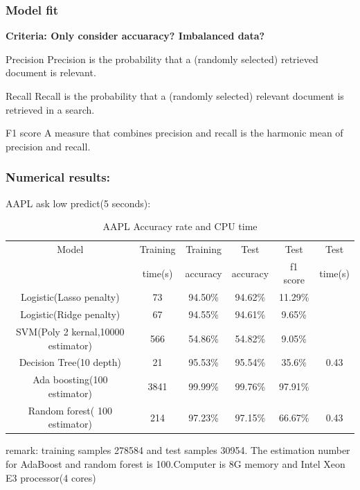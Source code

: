 \documentclass[xcolor={x11names,svgnames,dvipsnames}]{beamer}
\begin{document}
\begin{frame}
\frametitle{Model fit}
\small \textbf{Criteria: Only consider accuaracy? Imbalanced data?}\\
\begin{block}{Precision}
\scriptsize{Precision is the probability that a (randomly selected) retrieved document is relevant.}\\
\end{block}
\begin{block}{Recall}
\scriptsize{Recall is the probability that a (randomly selected) relevant document is retrieved in a search.}\\
\end{block}
\begin{block}{F1 score}
\scriptsize{A measure that combines precision and recall is the harmonic mean of precision and recall.}\\
\end{block}

\end{frame}


\begin{frame}
\frametitle{Numerical results:}

\begin{block}{AAPL ask low predict(5 seconds):}
\begin{table}[h!]\scriptsize
  \caption{AAPL Accuracy rate and CPU time}
\begin{center}
    \begin{tabular}{| c | c|c|c|c|c|}
    \hline

Model&	Training &	Training &	Test &	Test& Test\\
&	time(s)&	accuracy&	accuracy&	f1 score& time(s)\\
    \hline
Logistic(Lasso penalty)&	73&	94.50\%& 	94.62\%& 	11.29\%&\\
Logistic(Ridge penalty)	& 67&	94.55\%& 	94.61\%& 	9.65\%&\\
SVM(Poly 2 kernal,10000 estimator)&  	566& 	54.86\%& 	54.82\%&	9.05\%&\\
Decision Tree(10 depth)&	21& 	95.53\%& 	95.54\%& 	35.6\% & 0.43\\
Ada boosting(100 estimator)&	3841& 	99.99\%& 	99.76\%& 	\alert{97.91}\%&\\
Random forest( 100 estimator)&	214& 	97.23\%& 	97.15\%& 	\alert{66.67}\%& 0.43\\


\hline
\end{tabular}
\end{center}
\end{table}
\end{block}
\small{remark: \alert{training samples 278584 and test samples 30954}. The estimation number for AdaBoost and random forest is 100.Computer is 8G memory and Intel Xeon E3 processor(4 cores)}
\end{frame}​
\end{document}
